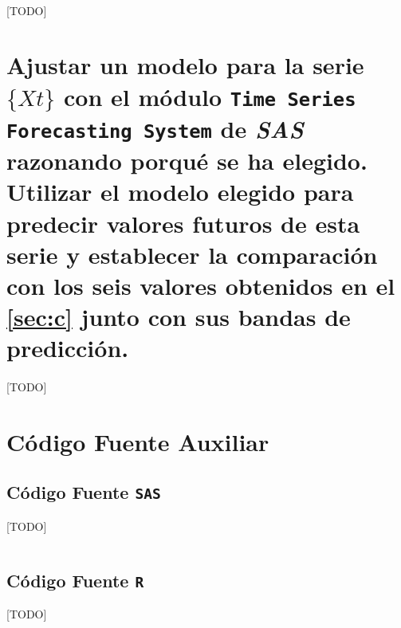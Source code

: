 \documentclass[a4paper, spanish]{article}
\begin{document}
    \begin{listing}[htb!]
      \centering
      \inputminted{SAS}{./res/code/e-prediction-forecast-method-2.sas}
      \caption{Cálculo del error de predicción $SSE_p$ mediante el \texttt{proc forecast} por el método alternativo (2).}
      \label{code:prediction_forecast_method_2}
    \end{listing}

    \paragraph{}
    [TODO]

  \section{Ajustar un modelo para la serie $\{ Xt \}$ con el módulo \texttt{Time Series Forecasting System} de \emph{SAS} razonando porqué se ha elegido. Utilizar el modelo elegido para predecir valores futuros de esta serie y establecer la comparación con los seis valores obtenidos en el \autoref{sec:c} junto con sus bandas de predicción.}
  \label{sec:f}

    \paragraph{}
    [TODO]

  \appendix
  \section{Código Fuente Auxiliar}
  \label{appendix:source_code}

    \subsection{Código Fuente \texttt{SAS}}
    \label{appendix:source_code_sas}
      [TODO]

      \begin{listing}[htb!]
        \centering
        \inputminted{SAS}{./res/code/a-01-data.sas}
        \caption{Generación del conjunto de datos \texttt{EJ2.SEMANAL}}
        \label{code:data_import}
      \end{listing}


    \subsection{Código Fuente \texttt{R}}
    \label{appendix:source_code_r}
      [TODO]

      \begin{listing}[htb!]
        \centering
        \inputminted{SAS}{./res/code/r/semanal.r}
        \caption{[TODO]}
        \label{code:semanal_analysis}
      \end{listing}
\end{document}
